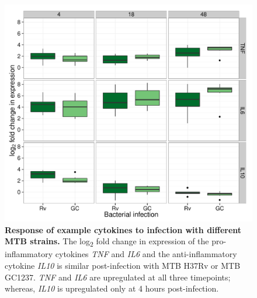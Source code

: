 \begin{figure}[!htb]
\centering
\includegraphics[width=5in]{img/ch02/fig-S08-ex-cytokines.pdf}
\caption[Response of example cytokines to infection with different MTB
  strains.]{\textbf{Response of example cytokines to infection with
    different MTB strains.} The log\textsubscript{2} fold change in
  expression of the pro-inflammatory cytokines \emph{TNF} and
  \emph{IL6} and the anti-inflammatory cytokine \emph{IL10} is similar
  post-infection with MTB H37Rv or MTB GC1237. \emph{TNF} and
  \emph{IL6} are upregulated at all three timepoints; whereas,
  \emph{IL10} is upregulated only at 4 hours post-infection.}
\label{fig:ex-cytokines}
\end{figure}

